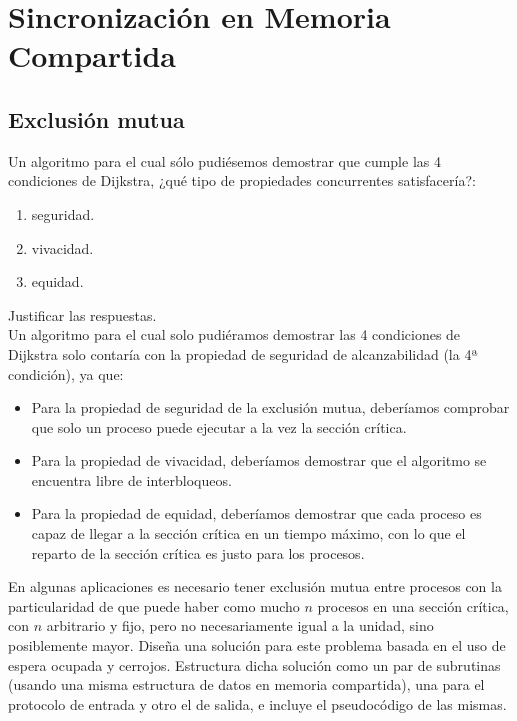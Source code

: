 \section{Sincronización en Memoria Compartida}
\subsection{Exclusión mutua}
\begin{ejercicio}
    Un algoritmo para el cual sólo pudiésemos demostrar que cumple las 4 condiciones de Dijkstra, ¿qué tipo de propiedades concurrentes satisfacería?: 
    \begin{enumerate}[label=(\alph*)]
        \item seguridad.
        \item vivacidad.
        \item equidad.
    \end{enumerate}
    Justificar las respuestas.\\

    Un algoritmo para el cual solo pudiéramos demostrar las 4 condiciones de Dijkstra solo contaría con la propiedad de seguridad de alcanzabilidad (la 4ª condición), ya que:
    \begin{itemize}
        \item Para la propiedad de seguridad de la exclusión mutua, deberíamos comprobar que solo un proceso puede ejecutar a la vez la sección crítica.
        \item Para la propiedad de vivacidad, deberíamos demostrar que el algoritmo se encuentra libre de interbloqueos.
        \item Para la propiedad de equidad, deberíamos demostrar que cada proceso es capaz de llegar a la sección crítica en un tiempo máximo, con lo que el reparto de la sección crítica es justo para los procesos.
    \end{itemize}
\end{ejercicio}

\begin{ejercicio} %
    En algunas aplicaciones es necesario tener exclusión mutua entre procesos con la particularidad de que puede haber como mucho $n$ procesos en una sección crítica, con $n$ arbitrario y fijo, pero no necesariamente igual a la unidad, sino posiblemente mayor. Diseña una solución para este problema basada en el uso de espera ocupada y cerrojos. Estructura dicha solución como un par de subrutinas (usando una misma estructura de datos en memoria compartida), una para el protocolo de entrada y otro el de salida, e incluye el pseudocódigo de las mismas.
\end{ejercicio}

